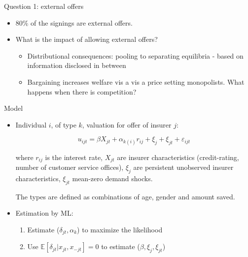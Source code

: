 \documentclass[10pt,aspectratio=169]{beamer}
\begin{document}
\begin{frame}{Question 1: external offers}

\begin{itemize}
   
    \item 80\% of the signings are external offers. 
    \item What is the impact of allowing external offers? 

    \begin{itemize}
        \item Distributional consequences: pooling to separating equilibria - based on information disclosed in between


        \item Bargaining increases welfare vis a vis a price setting monopolists. What happens when there is competition? 
\end{itemize}   
\end{itemize}
\end{frame}

\begin{frame}{Model}

\begin{itemize}
    \item Individual $i$, of type $k$,  valuation for offer of insurer $j$: 

    $$ u_{ijt} = \beta X_{jt}+ \alpha_{k(i)} r_{ij} + \xi_j +\xi_{jt} + \varepsilon_{ijt}  $$

    where $r_{ij}$ is the interest rate, $X_{jt}$  are insurer characteristics (credit-rating, number of customer service offices), $\xi_j$ are persistent unobserved insurer characteristics, $\xi_{jt}$ mean-zero demand shocks.  

    The types are defined as combinations of age, gender and amount saved.

    \item Estimation by ML: 
    \begin{enumerate}
        \item Estimate  ($\delta_{jt}, \alpha_k$) to maximize the likelihood 
        \item Use $\mathbb{E}[\delta_{jt}|x_{jt},x_{-jt}]= 0$ to estimate ($\beta, \xi_j, \xi_{jt}$)
    \end{enumerate}
\end{itemize}
\end{frame}
\end{document}
